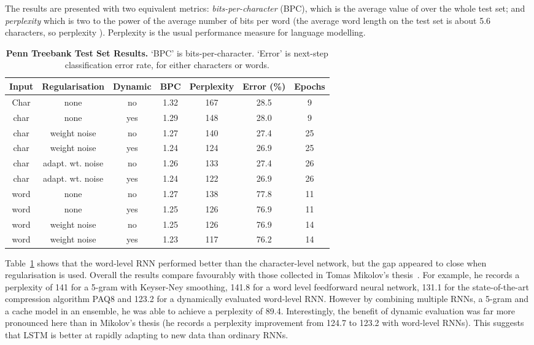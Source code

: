 \documentclass{article}
\newcommand{\tlabel}[1]{\label{tab:#1}}
\newcommand{\tref}[1]{Table~\ref{tab:#1}}
\newcommand{\capt}[2]{\caption[#1]{\textbf{#1}#2}}
\begin{document}
The results are presented with two equivalent metrics: \emph{bits-per-character} (BPC), which is the average value of   over the whole test set; and \emph{perplexity} which is two to the power of the average number of bits per word (the average word length on the test set is about 5.6 characters, so perplexity ). 
Perplexity is the usual performance measure for language modelling.

\begin{table}
\centering
\capt{Penn Treebank Test Set Results.}{ `BPC' is bits-per-character. `Error' is next-step classification error rate, for either characters or words.}
\tlabel{penn}
\vskip 0.15in
\begin{center}
\begin{footnotesize}
\begin{sc}\begin{tabular}{ccccccc}
\hline
Input & Regularisation & Dynamic & BPC & Perplexity & Error (\%) & Epochs\\
\hline
Char  & none  & no      & 1.32 & 167 & 28.5 & 9\\
char  & none  & yes     & 1.29 & 148  & 28.0 & 9\\
char  & weight noise  & no      & 1.27 & 140 & 27.4 & 25\\
char  & weight noise  & yes     & 1.24 & 124 & 26.9 & 25\\
char  & adapt. wt. noise  & no      & 1.26 & 133 & 27.4 & 26\\
char  & adapt. wt. noise  & yes     & 1.24 & 122 & 26.9 & 26\\
word  & none  & no      & 1.27    & 138 & 77.8 & 11\\
word  & none  & yes     & 1.25       & 126 & 76.9 & 11\\
word  & weight noise & no      & 1.25       & 126 & 76.9 & 14\\
word  & weight noise & yes     & 1.23       & 117 & 76.2 & 14\\
\hline
\end{tabular}
\end{sc}
\end{footnotesize}
\end{center}
\vskip -0.1in
\end{table}

\tref{penn} shows that the word-level RNN performed better than the character-level network, but the gap appeared to close when regularisation is used.
Overall the results compare favourably with those collected in Tomas Mikolov's thesis~\cite{mikolov12thesis}.
For example, he records a perplexity of 141 for a 5-gram with Keyser-Ney smoothing, 141.8 for a word level feedforward neural network, 131.1 for the state-of-the-art compression algorithm PAQ8 and 123.2 for a dynamically evaluated word-level RNN.
However by combining multiple RNNs, a 5-gram and a cache model in an ensemble, he was able to achieve a  perplexity of 89.4.
Interestingly, the benefit of dynamic evaluation was far more pronounced here than in Mikolov's thesis (he records a perplexity improvement from 124.7 to 123.2 with word-level RNNs).
This suggests that LSTM is better at rapidly adapting to new data than ordinary RNNs.
\end{document}
